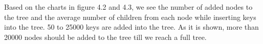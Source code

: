 \documentclass{report}
\begin{document}

Based on the charts in figure 4.2 and 4.3, we see the number of added nodes to the tree and the average number of children from each node while inserting keys into the tree. 50 to 25000 keys are added into the tree. As it is shown, more than 20000 nodes should be added to the tree till we reach a full tree. 
\end{document}
